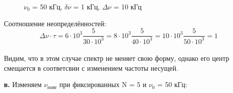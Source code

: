 \documentclass[a4paper,12pt]{article}
\begin{document}
\begin{enumerate}
\begin{figure}[h]
\begin{minipage}[h]{0.47\linewidth}
\end{minipage}
\vfill
\begin{minipage}[h]{0.47\linewidth}
 $\nu_0$ = 50 кГц, $\delta \nu$ = 1 кГц, $\Delta \nu$ = 10 кГц \\
\end{minipage}
\hfill
\caption{}
\label{ris:experimentalcorrelationsignals}
\end{figure}

Соотношение неопределённостей:
$$ \Delta \nu \cdot \tau = 6\cdot10^3\frac{5}{30\cdot10^3} = 8\cdot10^3\frac{5}{40\cdot10^3} = 10\cdot10^3\frac{5}{50\cdot10^3} = 1 $$\\
Видим, что в этом случае спектр не меняет свою форму, однако его центр смещается в соответсвии с изменением частоты несущей.


\newpage

\textbf{в.} Изменяем $\nu_\text{повт}$  при фиксированных N = 5 и $\nu_0$ = 50 кГц:


\end{enumerate}
\end{document}
